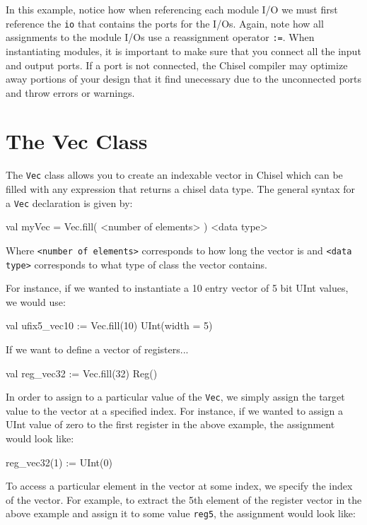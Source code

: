 In this example, notice how when referencing each module I/O we must first reference the \verb+io+ that contains the ports for the I/Os. Again, note how all assignments to the module I/Os use a reassignment operator \verb+:=+. When instantiating modules, it is important to make sure that you connect all the input and output ports. If a port is not connected, the Chisel compiler may optimize away portions of your design that it find unecessary due to the unconnected ports and throw errors or warnings.

\section{The Vec Class}

The \verb+Vec+ class allows you to create an indexable vector in Chisel which can be filled with any expression that returns a chisel data type. The general syntax for a \verb+Vec+ declaration is given by:
\begin{scala}
val myVec = 
  Vec.fill( <number of elements> ) { <data type> }
\end{scala}
Where \verb+<number of elements>+ corresponds to how long the vector is and \verb+<data type>+ corresponds to what type of class the vector contains.

For instance, if we wanted to instantiate a 10 entry vector of 5 bit UInt values, we would use:

\begin{scala}
val ufix5_vec10 := Vec.fill(10) { UInt(width = 5) }
\end{scala}

If we want to define a vector of registers...

\begin{scala}
val reg_vec32 := Vec.fill(32){ Reg() }
\end{scala}

In order to assign to a particular value of the \verb+Vec+, we simply assign the target value to the vector at a specified index. For instance, if we wanted to assign a UInt value of zero to the first register in the above example, the assignment would look like:

\begin{scala}
reg_vec32(1) := UInt(0)
\end{scala}

To access a particular element in the vector at some index, we specify the index of the vector. For example, to extract the 5th element of the register vector in the above example and assign it to some value \verb+reg5+, the assignment would look like:

